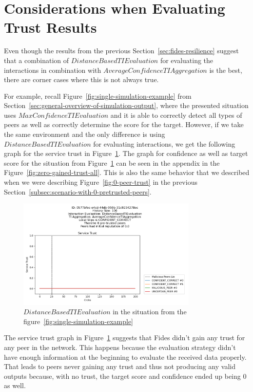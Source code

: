 \newpage
\section{Considerations when Evaluating Trust Results}
\label{sec:other-findings}

Even though the results from the previous Section~\ref{sec:fides-resilience} suggest that a combination of $DistanceBasedTIEvaluation$ for evaluating the interactions in combination with $AverageConfidenceTIAggregation$ is the best, there are corner cases where this is not always true.

For example, recall Figure~\ref{fig:single-simulation-example} from Section~\ref{sec:general-overview-of-simulation-output}, where the presented situation uses $MaxConfidenceTIEvaluation$ and it is able to correctly detect all types of peers as well as correctly determine the score for the target.
However, if we take the same environment and the only difference is using $DistanceBasedTIEvaluation$ for evaluating interactions, we get the following graph for the service trust in  Figure~\ref{fig:zero-gained-trust}. The graph for confidence as well as target score for the situation from Figure~\ref{fig:zero-gained-trust} can be seen in the appendix in the Figure~\ref{fig:zero-gained-trust-all}.
This is also the same behavior that we described when we were describing Figure~\ref{fig:0-peer-trust} in the previous Section~\ref{subsec:scenario-with-0-pretrusted-peers}.

\begin{figure}[ht]
    \centering
    \includegraphics[width=0.8\textwidth]{assets/zero_gained_trust.png}
    \caption{$DistanceBasedTIEvaluation$ in the situation from the figure~\ref{fig:single-simulation-example}}
    \label{fig:zero-gained-trust}
\end{figure}

The service trust graph in Figure~\ref{fig:zero-gained-trust} suggests that Fides didn't gain any trust for any peer in the network.
This happens because the evaluation strategy didn't have enough information at the beginning to evaluate the received data properly.
That leads to peers never gaining any trust and thus not producing any valid outputs because, with no trust, the target score and confidence ended up being $0$ as well.

